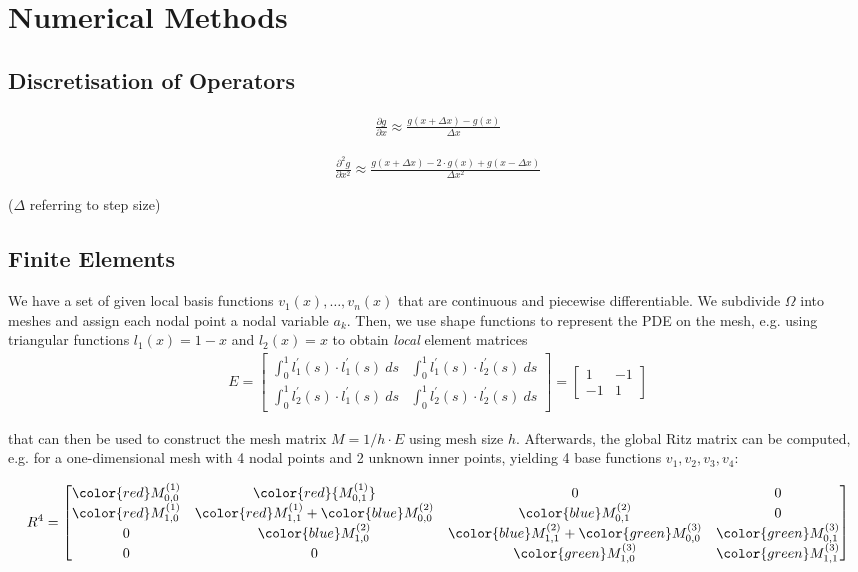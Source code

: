 \section{Numerical Methods}
\subsection{Discretisation of Operators}

\begin{align*}
	\frac{\partial g}{\partial x}
	\approx
	\frac{g(x + \Delta x) - g(x)}{\Delta x}
\end{align*}

\begin{align*}
	\frac{\partial^2 g}{\partial x^2}
	\approx
	\frac{g(x + \Delta x) - 2\cdot g(x) + g(x - \Delta x)}{\Delta x^2}
\end{align*}

($\Delta$ referring to step size)
\subsection{Finite Elements}

We have a set of given local basis functions $v_1(x), \ldots, v_n(x)$ that are continuous and piecewise differentiable.
We subdivide $\Omega$ into meshes and assign each nodal point a nodal variable $a_k$.
Then, we use shape functions to represent the PDE on the mesh,
e.g. using triangular functions $l_1(x)=1-x$ and $l_2(x) = x$ to obtain \emph{local} element matrices
\begin{align*}
	E = 
	\begin{bmatrix}
		\int_0^1 l_1^\prime(s)\cdot l_1^\prime(s)\ ds & \int_0^1 l_1^\prime(s)\cdot l_2^\prime(s)\ ds \\
		\int_0^1 l_2^\prime(s)\cdot l_1^\prime(s)\ ds & \int_0^1 l_2^\prime(s)\cdot l_2^\prime(s)\ ds
	\end{bmatrix}
	=
	\begin{bmatrix}
		1 & -1 \\
		-1 & 1
	\end{bmatrix}
\end{align*}

that can then be used to construct the mesh matrix $M=1/h\cdot E$ using mesh size $h$.
Afterwards, the global Ritz matrix can be computed, e.g. for a one-dimensional mesh with 4 nodal points and 2 unknown inner points,
yielding 4 base functions $v_1,v_2,v_3,v_4$:

\begin{align*}
	R^4 = \begin{bmatrix}
		{\color{red} M^{(1)}_{0,0}} & \color{red}{M^{(1)}_{0,1}} & 0 & 0 \\
		{\color{red} M^{(1)}_{1,0}} & {\color{red} M^{(1)}_{1,1}} + {\color{blue} M^{(2)}_{0,0}} & {\color{blue} M^{(2)}_{0,1}} & 0 \\
		0 & {\color{blue} M^{(2)}_{1,0}} & {\color{blue} M^{(2)}_{1,1}} + {\color{green} M^{(3)}_{0,0}} & {\color{green} M^{(3)}_{0,1}} \\
		0 & 0 & {\color{green} M^{(3)}_{1,0}} & {\color{green} M^{(3)}_{1,1}}
	\end{bmatrix}
\end{align*}

